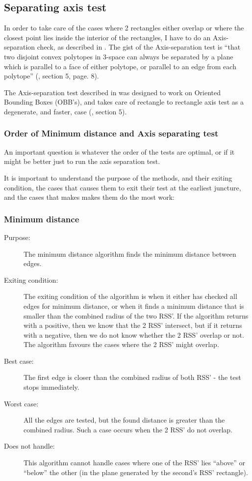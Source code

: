 \subsection{Separating axis test}
\label{sepAxis}

In order to take care of the cases where 2 rectangles either overlap or where the closest point lies inside the interior of the rectangles, I have to do an Axis-separation check, as described in \cite{237244}. The gist of the Axis-separation test is ``that two disjoint convex polytopes in 3-space can always be separated by a plane which is parallel to a face of either polytope, or parallel to an edge from each polytope'' (\cite{237244}, section 5, page. 8).

The Axis-separation test described in \cite{237244} was designed to work on Oriented Bounding Boxes (OBB's), and takes care of rectangle to rectangle axis test as a degenerate, and faster, case (\cite{237244}, section 5).

\subsubsection{Order of Minimum distance and Axis separating test}
\label{minAxisOrder}
An important question is whatever the order of the tests are optimal, or if it might be better just to run the axis separation test.

It is important to understand the purpose of the methods, and their exiting condition, the cases that causes them to exit their test at the earliest juncture, and the cases that makes makes them do the most work:

\subsubsection{Minimum distance}
\begin{description}
\item[Purpose:] The minimum distance algorithm finds the minimum distance between edges.
\item[Exiting condition:]The exiting condition of the algorithm is when it either has checked all edges for minimum distance, or when it finds a minimum distance that is smaller than the combined radius of the two RSS'. If the algorithm returns with a positive, then we know that the 2 RSS' intersect, but if it returns with a negative, then we do not know whether the 2 RSS' overlap or not. The algorithm favours the cases where the 2 RSS' might overlap.
\item[Best case:] The first edge is closer than the combined radius of both RSS' - the test stops immediately.
\item[Worst case:] All the edges are tested, but the found distance is greater than the combined radius. Such a case occurs when the 2 RSS' do not overlap.
\item[Does not handle:] This algorithm cannot handle cases where one of the RSS' lies ``above'' or ``below'' the other (in the plane generated by the second's RSS' rectangle).
\end{description}

